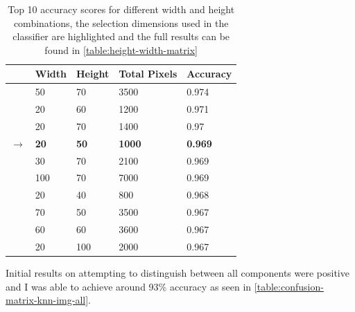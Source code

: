 \begin{table}[H]

    \begin{tabularx}{\textwidth}{ r X X X X }
    \toprule
    & Width & Height & Total Pixels & Accuracy \\
    \midrule
    & 50  & 70  & 3500 & 0.974 \\
    & 20  & 60  & 1200 & 0.971 \\
    & 20  & 70  & 1400 & 0.97 \\
    $\rightarrow$ & \textbf{20}  & \textbf{50}  & \textbf{1000} & \textbf{0.969} \\
    & 30  & 70  & 2100 & 0.969 \\
    & 100 & 70  & 7000 & 0.969 \\
    & 20  & 40  & 800  & 0.968 \\
    & 70  & 50  & 3500 & 0.967 \\
    & 60  & 60  & 3600 & 0.967 \\
    & 20  & 100 & 2000 & 0.967 \\
    \bottomrule
    \end{tabularx}

    \caption{Top 10 accuracy scores for different width and height combinations, the selection dimensions used in the classifier are highlighted and the full results can be found in \cref{table:height-width-matrix}}
    \label{table:knn-width-height-top}
\end{table}

Initial results on attempting to distinguish between all components were positive and I was able to achieve around 93\% accuracy as seen in \cref{table:confusion-matrix-knn-img-all}.

